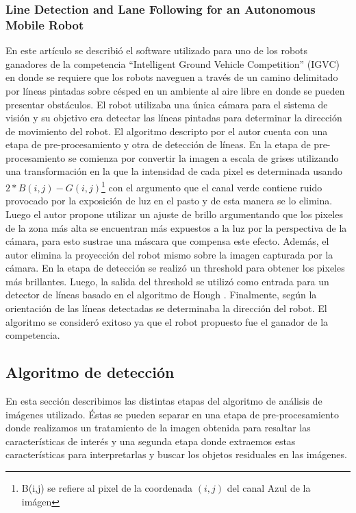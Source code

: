 	\subsubsection{Line Detection and Lane Following for an Autonomous Mobile Robot \cite{Bacha05}}
	En este art\'iculo se describi\'o el software utilizado para uno de los 
	robots ganadores de la competencia ``Intelligent Ground Vehicle 
	Competition'' (IGVC) en donde se requiere que los robots naveguen  a trav\'es de un camino delimitado por l\'ineas pintadas sobre c\'esped en un ambiente al aire libre en donde se pueden presentar obst\'aculos. El robot utilizaba una \'unica c\'amara para el sistema de visi\'on y su objetivo era detectar las l\'ineas pintadas 
para determinar la direcci\'on de movimiento del robot. El algoritmo 
descripto por el autor cuenta con una etapa de pre-procesamiento y otra 
de detecci\'on de l\'ineas. En la etapa de pre-procesamiento se comienza 
por convertir la imagen a escala de grises utilizando una 
transformaci\'on en la que la intensidad de cada pixel es determinada 
usando $2*B(i,j) - G(i,j)$\footnote{B(i,j) se refiere al pixel de la 
coordenada $(i,j)$ del canal Azul de la im\'agen} con el argumento que el canal verde contiene 
ruido provocado por la exposici\'on de luz en el pasto y de esta manera 
se lo elimina. Luego el autor propone utilizar un ajuste de brillo 
argumentando que los pixeles de la zona m\'as alta se encuentran m\'as 
expuestos a la luz por la perspectiva de la c\'amara, para esto sustrae 
una m\'ascara que compensa este efecto. Adem\'as, el autor elimina la 
proyecci\'on del robot mismo sobre la imagen capturada por la c\'amara. 
En la etapa de detecci\'on se realiz\'o un threshold para obtener los 
pixeles m\'as brillantes. Luego, la salida del threshold se utiliz\'o 
como entrada para un detector de l\'ineas basado en el algoritmo de 
Hough \cite{hough62}. Finalmente, seg\'un la orientaci\'on de las l\'ineas 
detectadas se determinaba la direcci\'on del robot. El algoritmo se consider\'o exitoso ya que el robot propuesto fue el ganador de la competencia.

	
\subsection{Algoritmo de detecci\'on}
En esta secci\'on describimos las distintas etapas del algoritmo de an\'alisis 
de im\'agenes utilizado. \'Estas se pueden separar en una etapa de 
pre-procesamiento donde realizamos un tratamiento de la imagen obtenida 
para resaltar las caracter\'isticas de inter\'es y  una segunda etapa 
donde extraemos estas caracter\'isticas para interpretarlas y buscar 
los objetos residuales en las im\'agenes.

